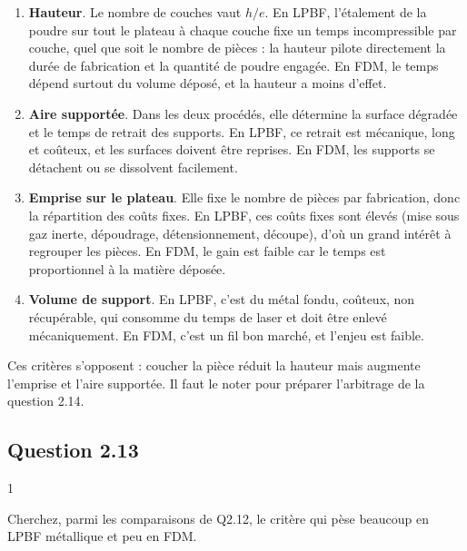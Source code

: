 \documentclass[11pt,a4paper]{article}
\providecommand{\tightlist}{\setlength{\itemsep}{0pt}\setlength{\parskip}{0pt}}
\begin{document}
\begin{enumerate}
\def\labelenumi{\arabic{enumi}.}
\tightlist
\item
  \textbf{Hauteur}. Le nombre de couches vaut \(h/e\). En LPBF, l'étalement de la poudre sur tout le plateau à chaque couche fixe un temps incompressible par couche, quel que soit le nombre de pièces : la hauteur pilote directement la durée de fabrication et la quantité de poudre engagée. En FDM, le temps dépend surtout du volume déposé, et la hauteur a moins d'effet.
\item
  \textbf{Aire supportée}. Dans les deux procédés, elle détermine la surface dégradée et le temps de retrait des supports. En LPBF, ce retrait est mécanique, long et coûteux, et les surfaces doivent être reprises. En FDM, les supports se détachent ou se dissolvent facilement.
\item
  \textbf{Emprise sur le plateau}. Elle fixe le nombre de pièces par fabrication, donc la répartition des coûts fixes. En LPBF, ces coûts fixes sont élevés (mise sous gaz inerte, dépoudrage, détensionnement, découpe), d'où un grand intérêt à regrouper les pièces. En FDM, le gain est faible car le temps est proportionnel à la matière déposée.
\item
  \textbf{Volume de support}. En LPBF, c'est du métal fondu, coûteux, non récupérable, qui consomme du temps de laser et doit être enlevé mécaniquement. En FDM, c'est un fil bon marché, et l'enjeu est faible.
\end{enumerate}

\begin{piege}

Ces critères s'opposent : coucher la pièce réduit la hauteur mais augmente l'emprise et l'aire supportée. Il faut le noter pour préparer l'arbitrage de la question 2.14.

\end{piege}

\hypertarget{question-2.13}{%
\subsection{Question 2.13}\label{question-2.13}}

\begin{indication}{1}

Cherchez, parmi les comparaisons de Q2.12, le critère qui pèse beaucoup en LPBF métallique et peu en FDM.

\end{indication}
\end{document}
